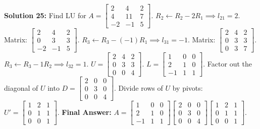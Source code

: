 \documentclass[11pt]{article}
\begin{document}
\vspace{0.5cm}
\textbf{Solution 25:}
Find LU for $A = \begin{bmatrix} 2 & 4 & 2 \\ 4 & 11 & 7 \\ -2 & -1 & 5 \end{bmatrix}$.
$R_2 \leftarrow R_2 - 2R_1 \implies l_{21} = 2$. Matrix: $\begin{bmatrix} 2 & 4 & 2 \\ 0 & 3 & 3 \\ -2 & -1 & 5 \end{bmatrix}$.
$R_3 \leftarrow R_3 - (-1)R_1 \implies l_{31} = -1$. Matrix: $\begin{bmatrix} 2 & 4 & 2 \\ 0 & 3 & 3 \\ 0 & 3 & 7 \end{bmatrix}$.
$R_3 \leftarrow R_3 - 1R_2 \implies l_{32} = 1$. $U = \begin{bmatrix} 2 & 4 & 2 \\ 0 & 3 & 3 \\ 0 & 0 & 4 \end{bmatrix}$.
$L = \begin{bmatrix} 1 & 0 & 0 \\ 2 & 1 & 0 \\ -1 & 1 & 1 \end{bmatrix}$.
Factor out the diagonal of $U$ into $D = \begin{bmatrix} 2 & 0 & 0 \\ 0 & 3 & 0 \\ 0 & 0 & 4 \end{bmatrix}$.
Divide rows of $U$ by pivots: $U' = \begin{bmatrix} 1 & 2 & 1 \\ 0 & 1 & 1 \\ 0 & 0 & 1 \end{bmatrix}$.
\textbf{Final Answer:} $A = \begin{bmatrix} 1 & 0 & 0 \\ 2 & 1 & 0 \\ -1 & 1 & 1 \end{bmatrix} \begin{bmatrix} 2 & 0 & 0 \\ 0 & 3 & 0 \\ 0 & 0 & 4 \end{bmatrix} \begin{bmatrix} 1 & 2 & 1 \\ 0 & 1 & 1 \\ 0 & 0 & 1 \end{bmatrix}$.
\end{document}
